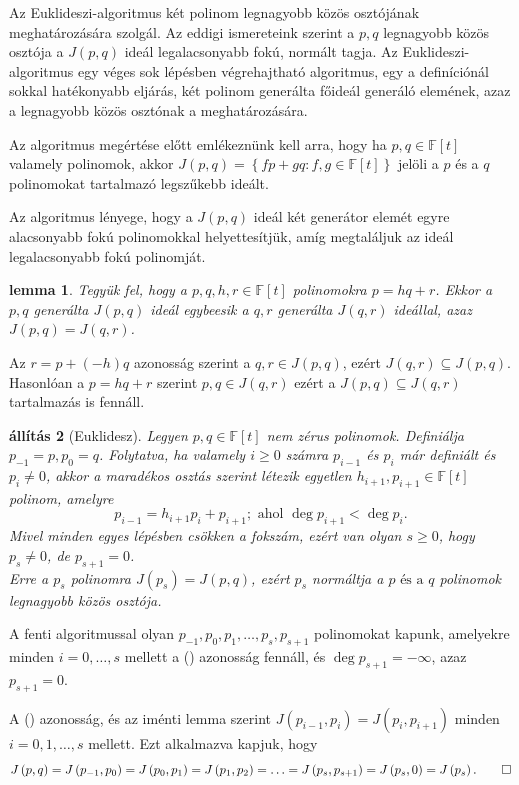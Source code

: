 \documentclass[a4paper, showtrims]{memoir}
\makeatletter
\renewenvironment{proof}[1][\proofname]
    {\par\pushQED{\qed}%
    \normalfont \topsep6\p@\@plus6\p@\relax
    \trivlist
    \item[\hskip\labelsep
        \itshape
    #1\@addpunct{:}]\ignorespaces}
    {\popQED\endtrivlist\@endpefalse}
\theoremstyle{plain}
\newtheorem{proposition}{állítás}[chapter]
\newtheorem{lemma}[proposition]{lemma}
\theoremstyle{remark}
\theoremstyle{definition}
\makeatother
\begin{document}
Az Euklideszi-algoritmus két polinom legnagyobb közös osztójának meghatározására szolgál.
Az eddigi ismereteink szerint a $p,q$ legnagyobb közös osztója a $J\left( p,q \right)$ ideál legalacsonyabb
fokú, normált tagja.
Az Euklideszi-algoritmus egy véges sok lépésben végrehajtható algoritmus,
egy a definíciónál sokkal hatékonyabb eljárás, két polinom generálta főideál generáló elemének,
azaz a legnagyobb közös osztónak a meghatározására.

Az algoritmus megértése előtt emlékeznünk kell arra,
hogy ha $p,q\in\mathbb{F}\left[ t \right]$ valamely polinomok, akkor
\(
J\left( p,q \right)=\left\{ fp+gq:f,g\in\mathbb{F}\left[ t \right] \right\}
\)
jelöli a $p$ és a $q$ polinomokat tartalmazó legszűkebb ideált.

Az algoritmus lényege, hogy a $J\left( p,q \right)$ ideál két generátor elemét egyre alacsonyabb fokú
polinomokkal helyettesítjük, amíg megtaláljuk az ideál legalacsonyabb fokú polinomját.
\begin{lemma}
    Tegyük fel, hogy a $p,q,h,r\in\mathbb{F}[t]$ polinomokra
    \(
    p=hq+r
    \).
    Ekkor a $p,q$ generálta $J\left( p,q \right)$ ideál egybeesik a $q,r$ generálta $J\left( q,r \right)$ ideállal, azaz $J\left( p,q \right)=J\left( q,r \right)$.
\end{lemma}
\begin{proof}
    Az $r=p+(-h)q$ azonosság szerint a $q,r\in J\left( p,q \right)$, 
    ezért $J\left( q,r \right)\subseteq J\left( p,q \right)$.
    Hasonlóan a $p=hq+r$ szerint $p,q\in J\left( q,r \right)$ ezért a 
    $J\left( p,q \right)\subseteq J\left( q,r \right)$
    tartalmazás is fennáll.
\end{proof}
\begin{proposition}[Euklidesz]
	Legyen $p,q\in\mathbb{F}\left[ t \right]$ nem zérus polinomok.
	Definiálja $p_{-1}=p,p_{0}=q$.
	Folytatva, ha valamely $i\geq 0$ számra $p_{i-1}$ és $p_i$ már definiált és $p_i\neq 0$,
	akkor a maradékos osztás szerint létezik egyetlen $h_{i+1},p_{i+1}\in\mathbb{F}\left[ t \right]$ polinom,
	amelyre
	\[
		p_{i-1}=h_{i+1}p_i+p_{i+1};
		\text{ ahol }
		\deg p_{i+1}<\deg p_i.\tag{\dag}
	\]
	Mivel minden egyes lépésben csökken a fokszám,
	ezért van olyan $s\geq 0$,
	hogy $p_s\neq 0$, de $p_{s+1}=0$.
	\\
	Erre a $p_s$ polinomra $J\left( p_s \right)=J\left( p,q \right)$, ezért
	$p_s$ normáltja a $p\text{ és a }q$ polinomok legnagyobb közös osztója.
\end{proposition}
\begin{proof}
	A fenti algoritmussal olyan
	$p_{-1}, p_0,p_1,\ldots,p_s,p_{s+1}$ polinomokat kapunk,
	amelyekre minden $i=0,\ldots,s$ mellett a (\dag) azonosság fennáll,
	és $\deg p_{s+1}=-\infty$,
	azaz $p_{s+1}=0$.

	A (\dag) azonosság, és az iménti lemma szerint
	\(
		J\left( p_{i-1},p_i \right)
		=
		J\left( p_i,p_{i+1} \right)
	\)
	minden $i=0,1,\ldots,s$ mellett.
	Ezt alkalmazva kapjuk, hogy
	\[
		J\left( p,q \right)
		=
		J\left( p_{-1},p_0 \right)
		=
		J\left( p_0,p_1 \right)
		=
		J\left( p_1,p_2 \right)
		=\ldots=
		J\left( p_s,p_{s+1} \right)
		=J\left( p_s, 0\right)
		=J\left( p_s \right).\qedhere
	\]
\end{proof}
\end{document}

